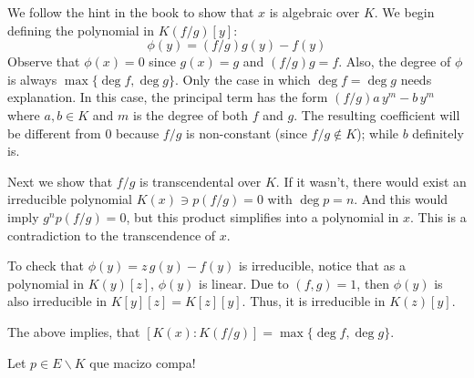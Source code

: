 We follow the hint in the book to show that $x$ is algebraic over $K$. 
We begin defining the polynomial in $K(f/g)[y]$:
$$\phi(y) = (f/g)g(y) - f(y)$$
Observe that $\phi(x) =0$ since $g(x)=g$ and $(f/g)g=f$. 
Also, the degree of $\phi$ is always $\max\{ \deg f, \deg g\}$. 
Only the case in which $\deg f= \deg g$ needs explanation. 
In this case, the principal term has the form $(f/g) a\, y^m - b\, y^m$ where $a,b\in K$ and $m$ is the degree of both $f$ and $g$.
The resulting coefficient will be different from 0 because $f/g$ is non-constant (since $f/g\notin K$); while $b$ definitely is.

Next we show that $f/g$ is transcendental over $K$.
If it wasn't, there would exist an irreducible polynomial $K(x) \ni p(f/g)=0$ with $\deg p = n$.
And this would imply $g^np(f/g)=0$, but this product simplifies into a polynomial in $x$.
This is a contradiction to the transcendence of $x$.

To check that $\phi(y)=z\,g(y)-f(y)$ is irreducible, notice that as a polynomial in $K(y)[z]$, $\phi(y)$ is linear. 
Due to $(f,g)=1$, then $\phi(y)$ is also irreducible in $K[y][z]=K[z][y]$.
Thus, it is irreducible in $K(z)[y]$.

The above implies, that $[K(x):K(f/g)]= \max\{ \deg f, \deg g\}$.

Let $p\in E\backslash K$ que macizo compa!

